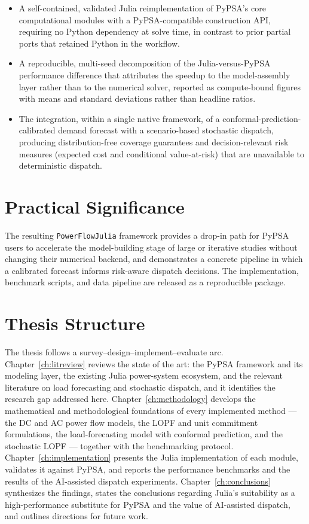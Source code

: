 \begin{itemize}
    \item A self-contained, validated Julia reimplementation of PyPSA's core computational modules with a PyPSA-compatible construction API, requiring no Python dependency at solve time, in contrast to prior partial ports that retained Python in the workflow.
    \item A reproducible, multi-seed decomposition of the Julia-versus-PyPSA performance difference that attributes the speedup to the model-assembly layer rather than to the numerical solver, reported as compute-bound figures with means and standard deviations rather than headline ratios.
    \item The integration, within a single native framework, of a conformal-prediction-calibrated demand forecast with a scenario-based stochastic dispatch, producing distribution-free coverage guarantees and decision-relevant risk measures (expected cost and conditional value-at-risk) that are unavailable to deterministic dispatch.
\end{itemize}

\section*{Practical Significance}

The resulting \texttt{PowerFlowJulia} framework provides a drop-in path for PyPSA users to accelerate the model-building stage of large or iterative studies without changing their numerical backend, and demonstrates a concrete pipeline in which a calibrated forecast informs risk-aware dispatch decisions. The implementation, benchmark scripts, and data pipeline are released as a reproducible package.

\section*{Thesis Structure}

The thesis follows a survey--design--implement--evaluate arc. Chapter~\ref{ch:litreview} reviews the state of the art: the PyPSA framework and its modeling layer, the existing Julia power-system ecosystem, and the relevant literature on load forecasting and stochastic dispatch, and it identifies the research gap addressed here. Chapter~\ref{ch:methodology} develops the mathematical and methodological foundations of every implemented method --- the DC and AC power flow models, the LOPF and unit commitment formulations, the load-forecasting model with conformal prediction, and the stochastic LOPF --- together with the benchmarking protocol. Chapter~\ref{ch:implementation} presents the Julia implementation of each module, validates it against PyPSA, and reports the performance benchmarks and the results of the AI-assisted dispatch experiments. Chapter~\ref{ch:conclusions} synthesizes the findings, states the conclusions regarding Julia's suitability as a high-performance substitute for PyPSA and the value of AI-assisted dispatch, and outlines directions for future work.
